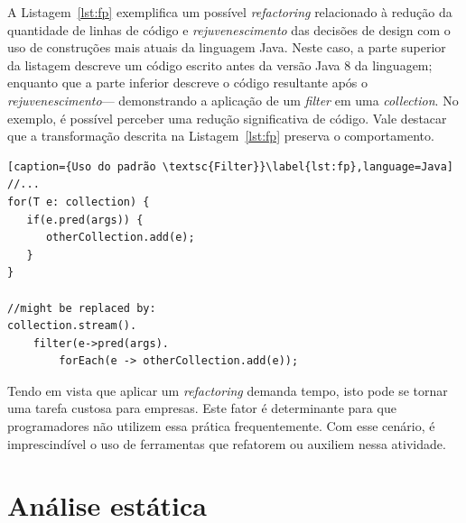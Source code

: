 
A Listagem~\ref{lst:fp} exemplifica um possível \emph{refactoring} relacionado \`{a} 
redução da quantidade de linhas de código e \emph{rejuvenescimento} 
das decisões de design com o uso de construções mais atuais da 
linguagem Java. Neste caso, a parte superior da listagem descreve um código 
escrito antes da versão Java 8 da linguagem; enquanto que a parte inferior descreve o 
código resultante após o \emph{rejuvenescimento}--- demonstrando a   
aplicação de um {\it filter} em uma {\it collection}. No exemplo, é  
possível perceber uma redução significativa de código. 
Vale destacar que a transformação descrita
na Listagem~\ref{lst:fp} preserva o comportamento.


\begin{lstlisting}[caption={Uso do padrão \textsc{Filter}}\label{lst:fp},language=Java] 
//...
for(T e: collection) {
   if(e.pred(args)) {
      otherCollection.add(e);
   }
}

//might be replaced by:
collection.stream().
	filter(e->pred(args).
		forEach(e -> otherCollection.add(e));
\end{lstlisting}




Tendo em vista que aplicar um \textit{refactoring} demanda tempo, 
isto pode se tornar uma tarefa custosa para empresas. Este fator é determinante 
para que programadores não utilizem essa prática frequentemente. Com esse 
cenário, é imprescindível o uso de ferramentas que refatorem ou auxiliem 
nessa atividade. 


\section{Análise estática}\label{sec:as}

